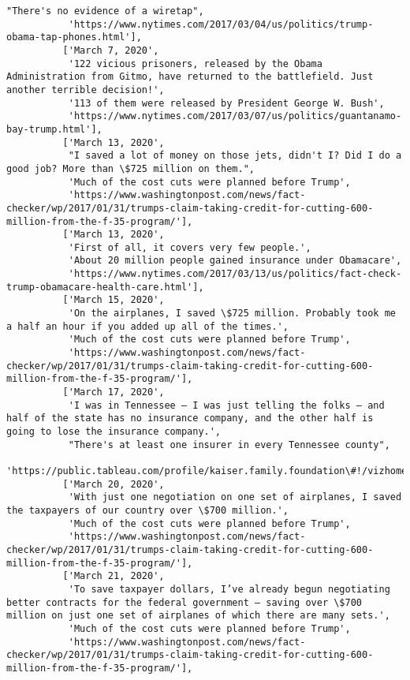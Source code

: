 \documentclass[11pt]{article}
\begin{document}
\begin{Verbatim}[commandchars=\\\{\}]
           "There's no evidence of a wiretap",
           'https://www.nytimes.com/2017/03/04/us/politics/trump-obama-tap-phones.html'],
          ['March 7, 2020',
           '122 vicious prisoners, released by the Obama Administration from Gitmo, have returned to the battlefield. Just another terrible decision!',
           '113 of them were released by President George W. Bush',
           'https://www.nytimes.com/2017/03/07/us/politics/guantanamo-bay-trump.html'],
          ['March 13, 2020',
           "I saved a lot of money on those jets, didn't I? Did I do a good job? More than \$725 million on them.",
           'Much of the cost cuts were planned before Trump',
           'https://www.washingtonpost.com/news/fact-checker/wp/2017/01/31/trumps-claim-taking-credit-for-cutting-600-million-from-the-f-35-program/'],
          ['March 13, 2020',
           'First of all, it covers very few people.',
           'About 20 million people gained insurance under Obamacare',
           'https://www.nytimes.com/2017/03/13/us/politics/fact-check-trump-obamacare-health-care.html'],
          ['March 15, 2020',
           'On the airplanes, I saved \$725 million. Probably took me a half an hour if you added up all of the times.',
           'Much of the cost cuts were planned before Trump',
           'https://www.washingtonpost.com/news/fact-checker/wp/2017/01/31/trumps-claim-taking-credit-for-cutting-600-million-from-the-f-35-program/'],
          ['March 17, 2020',
           'I was in Tennessee — I was just telling the folks — and half of the state has no insurance company, and the other half is going to lose the insurance company.',
           "There's at least one insurer in every Tennessee county",
           'https://public.tableau.com/profile/kaiser.family.foundation\#!/vizhome/InsurerParticipationinthe2017IndividualMarketplace/2017InsurerParticipation'],
          ['March 20, 2020',
           'With just one negotiation on one set of airplanes, I saved the taxpayers of our country over \$700 million.',
           'Much of the cost cuts were planned before Trump',
           'https://www.washingtonpost.com/news/fact-checker/wp/2017/01/31/trumps-claim-taking-credit-for-cutting-600-million-from-the-f-35-program/'],
          ['March 21, 2020',
           'To save taxpayer dollars, I’ve already begun negotiating better contracts for the federal government — saving over \$700 million on just one set of airplanes of which there are many sets.',
           'Much of the cost cuts were planned before Trump',
           'https://www.washingtonpost.com/news/fact-checker/wp/2017/01/31/trumps-claim-taking-credit-for-cutting-600-million-from-the-f-35-program/'],

\end{Verbatim}
\end{document}
